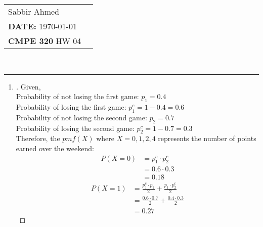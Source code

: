 \documentclass[paper=usletter, fontsize=12pt]{article}
\newcommand{\documentinfo}[5]{
    \begin{centering}
        \parbox{2in}{
        \begin{spacing}{1}
            \begin{flushleft}
                \begin{tabular}{l l}
                    #1 \\
                    #2 \\
                    #3 \\
                \end{tabular}\\
                \rule{\textwidth}{1pt}
            \end{flushleft}
        \end{spacing}
        }
    \end{centering}
}
\begin{document}
    \documentinfo{Sabbir Ahmed}{\textbf{DATE:} \today}{\textbf{CMPE 320} HW 04}
    \vspace{-0.2in}

    \begin{enumerate}

        \item
        \begin{proof}[\unskip\nopunct]
            Given,\\
            Probability of not losing the first game: $p_1=0.4$\\
            Probability of losing the first game: $p_1^c=1-0.4=0.6$\\
            Probability of not losing the second game: $p_2=0.7$\\
            Probability of losing the second game: $p_2^c=1-0.7=0.3$\\

            Therefore, the $pmf(X)$ where $X=0,1,2,4$ represents the number of
            points earned over the weekend:
            \begin{align*}
                P(X=0) & = p_1^c \cdot p_2^c\\
                & = 0.6 \cdot 0.3\\
                & = 0.18
            \end{align*}
            \begingroup
            \addtolength{\jot}{1em}
            \begin{align*}
                P(X=1) & = \frac{p_1^c \cdot p_2}{2} + \frac{p_1 \cdot
                p_2^c}{2}\\
                & = \frac{0.6 \cdot 0.7}{2} + \frac{0.4 \cdot 0.3}{2}\\
                & = 0.27
            \end{align*}
            \endgroup
        \end{proof}
        \vspace{0.2in}


\end{enumerate}
\end{document}
